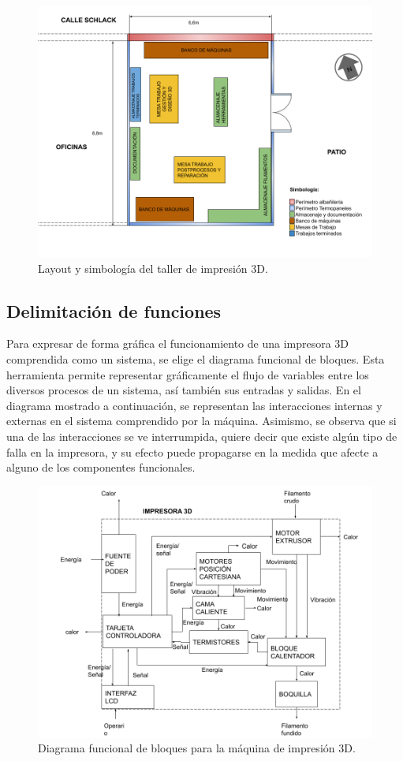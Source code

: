 \begin{figure}[H]
\centering
\includegraphics[scale=0.4]{images/layout.png}
\caption{Layout y simbología del taller de impresión 3D.}
\end{figure}

\subsection{Delimitación de funciones}

Para expresar de forma gráfica el funcionamiento de una impresora 3D comprendida como un sistema, se elige el diagrama funcional de bloques. Esta herramienta permite representar gráficamente el flujo de variables entre los diversos procesos de un sistema, así también sus entradas y salidas. En el diagrama mostrado a continuación, se representan las interacciones internas y externas en el sistema comprendido por la máquina. Asimismo, se observa que si una de las interacciones se ve interrumpida, quiere decir que existe algún tipo de falla en la impresora, y su efecto puede propagarse en la medida que afecte a alguno de los componentes funcionales.

\begin{figure}[H]
\centering
\includegraphics[scale=0.4]{images/diagramafuncional.png}
\caption{Diagrama funcional de bloques para la máquina de impresión 3D.}
\end{figure}

